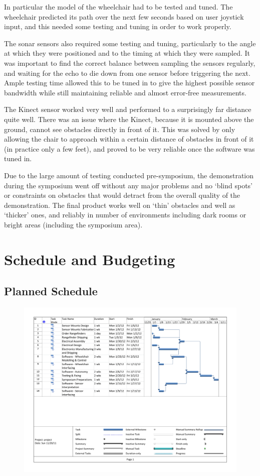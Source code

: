 \documentclass[oneside,final,a4paper]{report}
\begin{document}
In particular the model of the wheelchair had to be tested and tuned. The wheelchair predicted its path over the next few seconds based on user joystick input, and this needed some testing and tuning in order to work properly.

The sonar sensors also required some testing and tuning, particularly to the angle at which they were positioned and to the timing at which they were sampled. It was important to find the correct balance between sampling the sensors regularly, and waiting for the echo to die down from one sensor before triggering the next. Ample testing time allowed this to be tuned in to give the highest possible sensor bandwidth while still maintaining reliable and almost error-free measurements.

The Kinect sensor worked very well and performed to a surprisingly far distance quite well. There was an issue where the Kinect, because it is mounted above the ground, cannot see obstacles directly in front of it. This was solved by only allowing the chair to approach within a certain distance of obstacles in front of it (in practice only a few feet), and proved to be very reliable once the software was tuned in.

Due to the large amount of testing conducted pre-symposium, the demonstration during the symposium went off without any major problems and no `blind spots' or constraints on obstacles that would detract from the overall quality of the demonstration. The final product works well on `thin' obstacles and well as `thicker' ones, and reliably in number of environments including dark rooms or bright areas (including the symposium area).

\chapter{Schedule and Budgeting}

\section{Planned Schedule}
\begin{figure}
 \centering
 \includegraphics[scale=0.6]{gantt} \label{fig:gantt}
\end{figure}
\end{document}
